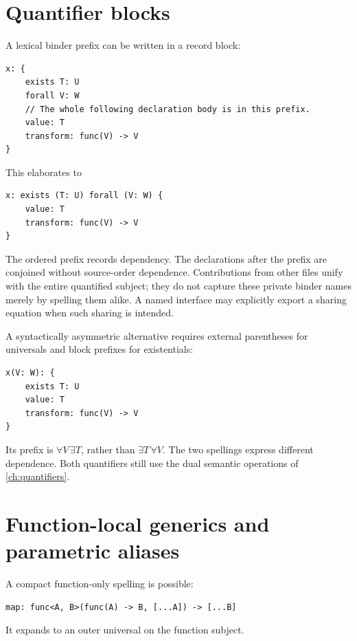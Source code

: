 \documentclass[11pt,a4paper,oneside]{report}
\theoremstyle{remark}
\begin{document}
\section{Quantifier blocks}
A lexical binder prefix can be written in a record block:
\par\noindent\begin{minipage}{\linewidth}
\begin{lstlisting}
x: {
    exists T: U
    forall V: W
    // The whole following declaration body is in this prefix.
    value: T
    transform: func(V) -> V
}
\end{lstlisting}
\end{minipage}\par
This elaborates to
\par\noindent\begin{minipage}{\linewidth}
\begin{lstlisting}
x: exists (T: U) forall (V: W) {
    value: T
    transform: func(V) -> V
}
\end{lstlisting}
\end{minipage}\par
The ordered prefix records dependency. The declarations after the prefix are
conjoined without source-order dependence. Contributions from other files
unify with the entire quantified subject; they do not capture these private
binder names merely by spelling them alike. A named interface may explicitly
export a sharing equation when such sharing is intended.

A syntactically asymmetric alternative requires external parentheses for
universals and block prefixes for existentials:
\par\noindent\begin{minipage}{\linewidth}
\begin{lstlisting}
x(V: W): {
    exists T: U
    value: T
    transform: func(V) -> V
}
\end{lstlisting}
\end{minipage}\par
Its prefix is $\forall V\,\exists T$, rather than $\exists T\,\forall V$.
The two spellings express different dependence. Both quantifiers still use the
dual semantic operations of \cref{ch:quantifiers}.

\section{Function-local generics and parametric aliases}
A compact function-only spelling is possible:
\par\noindent\begin{minipage}{\linewidth}
\begin{lstlisting}
map: func<A, B>(func(A) -> B, [...A]) -> [...B]
\end{lstlisting}
\end{minipage}\par
It expands to an outer universal on the function subject.
\end{document}
